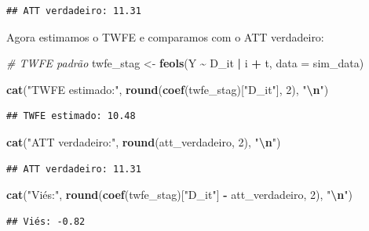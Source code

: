 \documentclass[
]{article}
\newenvironment{Shaded}{\begin{snugshade}}{\end{snugshade}}
\newcommand{\AttributeTok}[1]{\textcolor[rgb]{0.13,0.29,0.53}{#1}}
\newcommand{\CommentTok}[1]{\textcolor[rgb]{0.56,0.35,0.01}{\textit{#1}}}
\newcommand{\DecValTok}[1]{\textcolor[rgb]{0.00,0.00,0.81}{#1}}
\newcommand{\FunctionTok}[1]{\textcolor[rgb]{0.13,0.29,0.53}{\textbf{#1}}}
\newcommand{\NormalTok}[1]{#1}
\newcommand{\OtherTok}[1]{\textcolor[rgb]{0.56,0.35,0.01}{#1}}
\newcommand{\SpecialCharTok}[1]{\textcolor[rgb]{0.81,0.36,0.00}{\textbf{#1}}}
\newcommand{\StringTok}[1]{\textcolor[rgb]{0.31,0.60,0.02}{#1}}
\begin{document}
\begin{verbatim}
## ATT verdadeiro: 11.31
\end{verbatim}

Agora estimamos o TWFE e comparamos com o ATT verdadeiro:

\begin{Shaded}
\begin{Highlighting}[]
\CommentTok{\# TWFE padrão}
\NormalTok{twfe\_stag }\OtherTok{\textless{}{-}} \FunctionTok{feols}\NormalTok{(Y }\SpecialCharTok{\textasciitilde{}}\NormalTok{ D\_it }\SpecialCharTok{|}\NormalTok{ i }\SpecialCharTok{+}\NormalTok{ t, }\AttributeTok{data =}\NormalTok{ sim\_data)}

\FunctionTok{cat}\NormalTok{(}\StringTok{"TWFE estimado:"}\NormalTok{, }\FunctionTok{round}\NormalTok{(}\FunctionTok{coef}\NormalTok{(twfe\_stag)[}\StringTok{"D\_it"}\NormalTok{], }\DecValTok{2}\NormalTok{), }\StringTok{"}\SpecialCharTok{\textbackslash{}n}\StringTok{"}\NormalTok{)}
\end{Highlighting}
\end{Shaded}

\begin{verbatim}
## TWFE estimado: 10.48
\end{verbatim}

\begin{Shaded}
\begin{Highlighting}[]
\FunctionTok{cat}\NormalTok{(}\StringTok{"ATT verdadeiro:"}\NormalTok{, }\FunctionTok{round}\NormalTok{(att\_verdadeiro, }\DecValTok{2}\NormalTok{), }\StringTok{"}\SpecialCharTok{\textbackslash{}n}\StringTok{"}\NormalTok{)}
\end{Highlighting}
\end{Shaded}

\begin{verbatim}
## ATT verdadeiro: 11.31
\end{verbatim}

\begin{Shaded}
\begin{Highlighting}[]
\FunctionTok{cat}\NormalTok{(}\StringTok{"Viés:"}\NormalTok{, }\FunctionTok{round}\NormalTok{(}\FunctionTok{coef}\NormalTok{(twfe\_stag)[}\StringTok{"D\_it"}\NormalTok{] }\SpecialCharTok{{-}}\NormalTok{ att\_verdadeiro, }\DecValTok{2}\NormalTok{), }\StringTok{"}\SpecialCharTok{\textbackslash{}n}\StringTok{"}\NormalTok{)}
\end{Highlighting}
\end{Shaded}

\begin{verbatim}
## Viés: -0.82
\end{verbatim}
\end{document}
